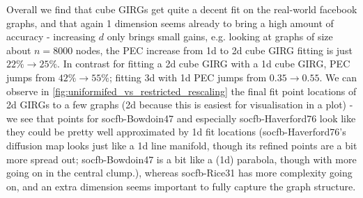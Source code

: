 Overall we find that cube GIRGs get quite a decent fit on the real-world facebook graphs, and that again 1 dimension seems already to bring a high amount of accuracy - increasing $d$ only brings small gains, e.g. looking at graphs of size about $n=8000$ nodes, the PEC increase from 1d to 2d cube GIRG fitting is just $22\% \to 25\%$. In contrast for fitting a 2d cube GIRG with a 1d cube GIRG, PEC jumps from $42\% \to 55\%$; fitting 3d with 1d PEC jumps from $0.35 \to 0.55$. We can observe in \cref{fig:uniformifed_vs_restricted_rescaling} the final fit point locations of 2d GIRGs to a few graphs (2d because this is easiest for visualisation in a plot) - we see that points for socfb-Bowdoin47 and especially socfb-Haverford76 look like they could be pretty well approximated by 1d fit locations (socfb-Haverford76's diffusion map looks just like a 1d line manifold, though its refined points are a bit more spread out; socfb-Bowdoin47 is a bit like a (1d) parabola, though with more going on in the central clump.), whereas socfb-Rice31 has more complexity going on, and an extra dimension seems important to fully capture the graph structure.







